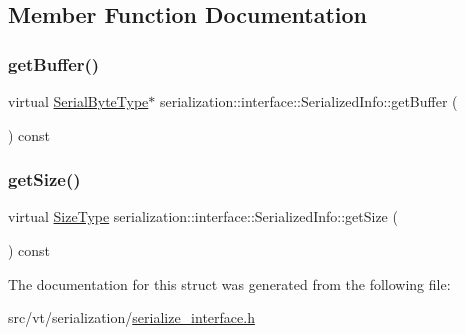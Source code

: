 \subsection{Member Function Documentation}
\mbox{\label{structserialization_1_1interface_1_1_serialized_info_ab0f29c01688d274971617100658391c3}} 
\subsubsection{\texorpdfstring{get\+Buffer()}{getBuffer()}}
{\footnotesize\ttfamily virtual \hyperlink{namespaceserialization_1_1interface_a718748616a908c35e6080b71d7790a76}{Serial\+Byte\+Type}$\ast$ serialization\+::interface\+::\+Serialized\+Info\+::get\+Buffer (\begin{DoxyParamCaption}{ }\end{DoxyParamCaption}) const\hspace{0.3cm}{\ttfamily [pure virtual]}}

\mbox{\label{structserialization_1_1interface_1_1_serialized_info_ad8daad650c32689ffbc63f57f8678df8}} 
\subsubsection{\texorpdfstring{get\+Size()}{getSize()}}
{\footnotesize\ttfamily virtual \hyperlink{namespaceserialization_1_1interface_a2ffaaa9b168f9cbcfe454ab036444403}{Size\+Type} serialization\+::interface\+::\+Serialized\+Info\+::get\+Size (\begin{DoxyParamCaption}{ }\end{DoxyParamCaption}) const\hspace{0.3cm}{\ttfamily [pure virtual]}}



The documentation for this struct was generated from the following file\+:\begin{DoxyCompactItemize}
\item 
src/vt/serialization/\hyperlink{serialize__interface_8h}{serialize\+\_\+interface.\+h}\end{DoxyCompactItemize}
